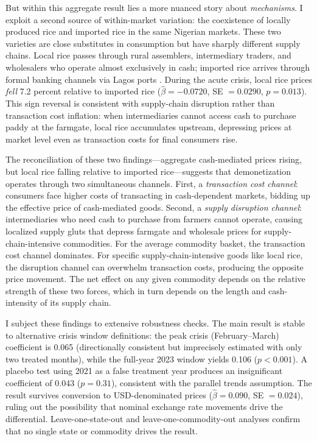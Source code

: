 \documentclass[12pt]{article}
\begin{document}
But within this aggregate result lies a more nuanced story about \emph{mechanisms}. I exploit a second source of within-market variation: the coexistence of locally produced rice and imported rice in the same Nigerian markets. These two varieties are close substitutes in consumption but have sharply different supply chains. Local rice passes through rural assemblers, intermediary traders, and wholesalers who operate almost exclusively in cash; imported rice arrives through formal banking channels via Lagos ports \citep{gyimah-brempong2016food}. During the acute crisis, local rice prices \emph{fell} 7.2 percent relative to imported rice ($\hat{\beta} = -0.0720$, SE $= 0.0290$, $p = 0.013$). This sign reversal is consistent with supply-chain disruption rather than transaction cost inflation: when intermediaries cannot access cash to purchase paddy at the farmgate, local rice accumulates upstream, depressing prices at market level even as transaction costs for final consumers rise.

The reconciliation of these two findings---aggregate cash-mediated prices rising, but local rice falling relative to imported rice---suggests that demonetization operates through two simultaneous channels. First, a \emph{transaction cost channel}: consumers face higher costs of transacting in cash-dependent markets, bidding up the effective price of cash-mediated goods. Second, a \emph{supply disruption channel}: intermediaries who need cash to purchase from farmers cannot operate, causing localized supply gluts that depress farmgate and wholesale prices for supply-chain-intensive commodities. For the average commodity basket, the transaction cost channel dominates. For specific supply-chain-intensive goods like local rice, the disruption channel can overwhelm transaction costs, producing the opposite price movement. The net effect on any given commodity depends on the relative strength of these two forces, which in turn depends on the length and cash-intensity of its supply chain.

I subject these findings to extensive robustness checks. The main result is stable to alternative crisis window definitions: the peak crisis (February--March) coefficient is 0.065 (directionally consistent but imprecisely estimated with only two treated months), while the full-year 2023 window yields 0.106 ($p < 0.001$). A placebo test using 2021 as a false treatment year produces an insignificant coefficient of 0.043 ($p = 0.31$), consistent with the parallel trends assumption. The result survives conversion to USD-denominated prices ($\hat{\beta} = 0.090$, SE $= 0.024$), ruling out the possibility that nominal exchange rate movements drive the differential. Leave-one-state-out and leave-one-commodity-out analyses confirm that no single state or commodity drives the result.
\end{document}
